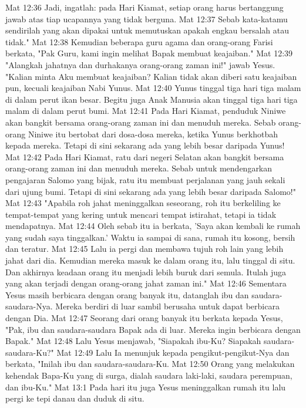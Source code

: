 Mat 12:36  Jadi, ingatlah: pada Hari Kiamat, setiap orang harus bertanggung jawab atas tiap ucapannya yang tidak berguna.
Mat 12:37  Sebab kata-katamu sendirilah yang akan dipakai untuk memutuskan apakah engkau bersalah atau tidak."
Mat 12:38  Kemudian beberapa guru agama dan orang-orang Farisi berkata, "Pak Guru, kami ingin melihat Bapak membuat keajaiban."
Mat 12:39  "Alangkah jahatnya dan durhakanya orang-orang zaman ini!" jawab Yesus. "Kalian minta Aku membuat keajaiban? Kalian tidak akan diberi satu keajaiban pun, kecuali keajaiban Nabi Yunus.
Mat 12:40  Yunus tinggal tiga hari tiga malam di dalam perut ikan besar. Begitu juga Anak Manusia akan tinggal tiga hari tiga malam di dalam perut bumi.
Mat 12:41  Pada Hari Kiamat, penduduk Niniwe akan bangkit bersama orang-orang zaman ini dan menuduh mereka. Sebab orang-orang Niniwe itu bertobat dari dosa-dosa mereka, ketika Yunus berkhotbah kepada mereka. Tetapi di sini sekarang ada yang lebih besar daripada Yunus!
Mat 12:42  Pada Hari Kiamat, ratu dari negeri Selatan akan bangkit bersama orang-orang zaman ini dan menuduh mereka. Sebab untuk mendengarkan pengajaran Salomo yang bijak, ratu itu membuat perjalanan yang jauh sekali dari ujung bumi. Tetapi di sini sekarang ada yang lebih besar daripada Salomo!"
Mat 12:43  "Apabila roh jahat meninggalkan seseorang, roh itu berkeliling ke tempat-tempat yang kering untuk mencari tempat istirahat, tetapi ia tidak mendapatnya.
Mat 12:44  Oleh sebab itu ia berkata, 'Saya akan kembali ke rumah yang sudah saya tinggalkan.' Waktu ia sampai di sana, rumah itu kosong, bersih dan teratur.
Mat 12:45  Lalu ia pergi dan membawa tujuh roh lain yang lebih jahat dari dia. Kemudian mereka masuk ke dalam orang itu, lalu tinggal di situ. Dan akhirnya keadaan orang itu menjadi lebih buruk dari semula. Itulah juga yang akan terjadi dengan orang-orang jahat zaman ini."
Mat 12:46  Sementara Yesus masih berbicara dengan orang banyak itu, datanglah ibu dan saudara-saudara-Nya. Mereka berdiri di luar sambil berusaha untuk dapat berbicara dengan Dia.
Mat 12:47  Seorang dari orang banyak itu berkata kepada Yesus, "Pak, ibu dan saudara-saudara Bapak ada di luar. Mereka ingin berbicara dengan Bapak."
Mat 12:48  Lalu Yesus menjawab, "Siapakah ibu-Ku? Siapakah saudara-saudara-Ku?"
Mat 12:49  Lalu Ia menunjuk kepada pengikut-pengikut-Nya dan berkata, "Inilah ibu dan saudara-saudara-Ku.
Mat 12:50  Orang yang melakukan kehendak Bapa-Ku yang di surga, dialah saudara laki-laki, saudara perempuan, dan ibu-Ku."
Mat 13:1  Pada hari itu juga Yesus meninggalkan rumah itu lalu pergi ke tepi danau dan duduk di situ.
